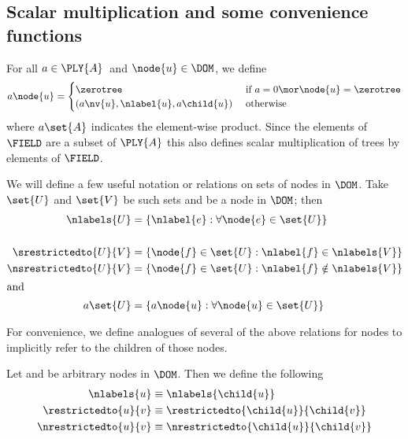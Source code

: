 \subsection{Scalar multiplication and some convenience functions}
\begin{definition}
  For all \(a \in \PLY{A}\)\ and \(\node{u} \in \DOM\), we
  define
  \begin{align*}
      a \node{u} = \begin{cases}
        \zerotree  & \text{ if } a = 0 \mor \node{u} = \zerotree \\
        (a \nv{u}, \nlabel{u}, a\child{u}) & \text{ otherwise }
      \end{cases}
  \end{align*}
  where $a\set{A}$ indicates the element-wise product.  Since the
  elements of $\FIELD$ are a subset of $\PLY{A}$ this also defines scalar
  multiplication of trees by elements of $\FIELD$.
\end{definition}

\begin{definition}\label{useful-set-functions}
  We will define a few useful notation or relations on sets of nodes
  in $\DOM$. Take \(\set{U}\) and \(\set{V}\) be such sets and
   be a node in $\DOM$; then 
  \begin{align*}
      \nlabels{U} &= \{\nlabel{e}: \forall \node{e} \in \set{U}\} \notag\\
      & \notag\\
      \srestrictedto{U}{V} &= \{\node{f} \in \set{U}: \nlabel{f} \in \nlabels{V} \} \notag\\
      \nsrestrictedto{U}{V} &= \{ \node{f} \in \set{U}: \nlabel{f} \notin \nlabels{V} \} \label{restrictions}\notag\\
      \intertext{and}
      a \set{U} &= \{a \node{u}: \forall \node{u} \in \set{U}\} \notag
  \end{align*}
\end{definition}


\begin{definition}\label{useful-node-functions}
  For convenience, we define analogues of several of the above
  relations for nodes to implicitly refer to the children of
  those nodes.

  Let  and  be arbitrary nodes in $\DOM$.  Then we
  define the following
  \begin{align*}
      \nlabels{u} &\equiv \nlabels{\child{u}}\\
      \restrictedto{u}{v} &\equiv \restrictedto{\child{u}}{\child{v}}\\
      \nrestrictedto{u}{v} &\equiv \nrestrictedto{\child{u}}{\child{v}}
  \end{align*}
\end{definition}

